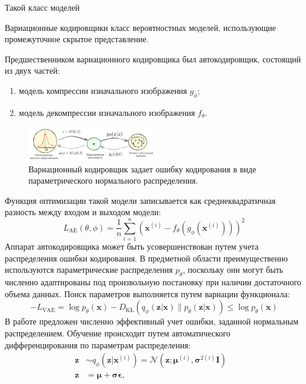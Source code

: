 

Такой класс моделей

Вариационные кодировщики класс вероятностных моделей, использующие промежуточное скрытое представление.

Предшественником вариационного кодировщика был автокодировщик, состоящий из двух частей:
 \begin{enumerate}
    \item модель компрессии изначального изображения $g_\phi$;
    \item модель декомпрессии изначального изображения $f_\theta$.
\end{enumerate}

\begin{figure}[h]
    \centering
    \includegraphics[width=0.5\textwidth]{assets/ml/generation/vae.excalidraw.png}
    \caption{Вариационный кодировщик задает ошибку кодирования в виде параметрического нормального распределения.}
    \label{discr_vs_gen}
\end{figure}
Функция оптимизации такой модели записывается как среднеквадратичная разность между входом и выходом модели:
\begin{equation}
    L_\text{AE}(\theta, \phi) = \frac{1}{n}\sum_{i=1}^n (\mathbf{x}^{(i)} - f_\theta(g_\phi(\mathbf{x}^{(i)})))^2
\end{equation}
Аппарат автокодировщика может быть усовершенствован путем учета распределения ошибки кодирования. В предметной области
преимущественно используются параметрические распределения $p_\theta$, поскольку они могут быть численно адаптированы под 
произвольную постановку при наличии достаточного объема данных. Поиск параметров выполняется путем вариации функционала:
\begin{equation}
    -L_\text{VAE} = \log p_\theta(\mathbf{x}) - D_\text{KL}( q_\phi(\mathbf{z}\vert\mathbf{x}) \| p_\theta(\mathbf{z}\vert\mathbf{x}) ) \leq \log p_\theta(\mathbf{x})
\end{equation}
В работе \cite{kingma2013auto} предложен численно эффективный учет ошибки, заданной нормальным распределением. Обучение происходит путем автоматического 
дифференцирования по параметрам распределения: 
\begin{equation}
    \begin{aligned}
        \mathbf{z} &\sim q_\phi(\mathbf{z}\vert\mathbf{x}^{(i)}) = \mathcal{N}(\mathbf{z}; \boldsymbol{\mu}^{(i)}, \boldsymbol{\sigma}^{2(i)}\boldsymbol{I}) & \\
        \mathbf{z} &= \boldsymbol{\mu} + \boldsymbol{\sigma} \boldsymbol{\epsilon},
    \end{aligned}
\end{equation}
